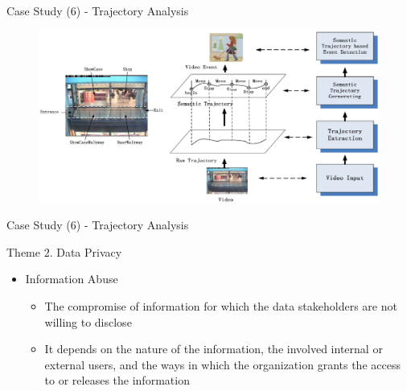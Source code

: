 \documentclass[
 size=14pt,
 paper=smartboard,  %
 mode=present, 		%
 display=slides, 	%
 style=tuliplab,  	%
 pauseslide,
 fleqn,leqno]{powerdot}{}
\begin{document}
\begin{slide}[toc=,bm=]{Case Study (6) - Trajectory Analysis}
\begin{figure}[htbp]
  \includegraphics[width=1.0\textwidth]{figures//theme1//dsa_3.eps}
\end{figure}


\footnotesize{}
\end{slide}



\begin{slide}[toc=,bm=]{Case Study (6) - Trajectory Analysis}
\begin{figure}[ht]
\end{figure}
\end{slide}


\begin{slide}{Theme 2. Data Privacy}
\begin{itemize}
\item
Information Abuse

\begin{itemize}
\item
The compromise of information
for which the data stakeholders are not willing to disclose

\item
It depends on the nature of the information,
the involved internal or external users,
and the ways in which the organization grants the access to
or releases the information

\end{itemize}
\end{itemize}

\end{slide}
\end{document}
